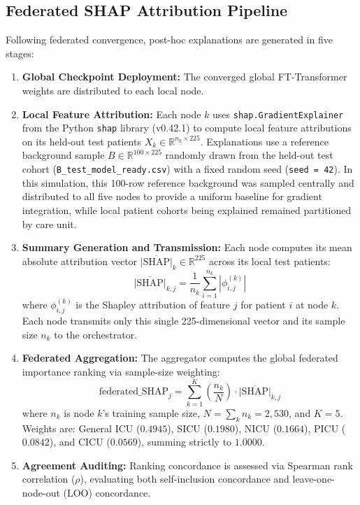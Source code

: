 \documentclass[runningheads]{llncs}
\begin{document}
\subsection{Federated SHAP Attribution Pipeline}
Following federated convergence, post-hoc explanations are generated in five stages:
\begin{enumerate}
\item \textbf{Global Checkpoint Deployment:} The converged global FT-Transformer weights are distributed to each local node.
\item \textbf{Local Feature Attribution:} Each node $k$ uses \texttt{shap.GradientExplainer} from the Python \texttt{shap} library (v0.42.1) to compute local feature attributions on its held-out test patients $X_k \in \mathbb{R}^{n_k \times 225}$. Explanations use a reference background sample $B \in \mathbb{R}^{100 \times 225}$ randomly drawn from the held-out test cohort (\texttt{B\_test\_model\_ready.csv}) with a fixed random seed (\texttt{seed = 42}). In this simulation, this 100-row reference background was sampled centrally and distributed to all five nodes to provide a uniform baseline for gradient integration, while local patient cohorts being explained remained partitioned by care unit.
\item \textbf{Summary Generation and Transmission:} Each node computes its mean absolute attribution vector $\overline{|\text{SHAP}|}_k \in \mathbb{R}^{225}$ across its local test patients:
\begin{equation}
\overline{|\text{SHAP}|}_{k,j} = \frac{1}{n_k} \sum_{i=1}^{n_k} |\phi_{i,j}^{(k)}|
\end{equation}
where $\phi_{i,j}^{(k)}$ is the Shapley attribution of feature $j$ for patient $i$ at node $k$. Each node transmits only this single 225-dimensional vector and its sample size $n_k$ to the orchestrator.
\item \textbf{Federated Aggregation:} The aggregator computes the global federated importance ranking via sample-size weighting:
\begin{equation}
\text{federated\_SHAP}_j = \sum_{k=1}^{K} \left(\frac{n_k}{N}\right) \cdot \overline{|\text{SHAP}|}_{k,j}
\label{eq:agg}
\end{equation}
where $n_k$ is node $k$'s training sample size, $N = \sum_k n_k = 2{,}530$, and $K = 5$. Weights are: General ICU ($0.4945$), SICU ($0.1980$), NICU ($0.1664$), PICU ($0.0842$), and CICU ($0.0569$), summing strictly to $1.0000$.
\item \textbf{Agreement Auditing:} Ranking concordance is assessed via Spearman rank correlation ($\rho$), evaluating both self-inclusion concordance and leave-one-node-out (LOO) concordance.
\end{enumerate}
\end{document}
